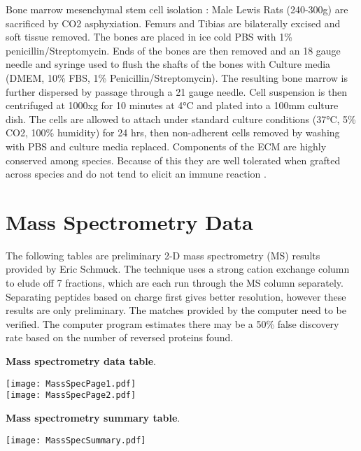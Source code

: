 \begin{outline}
\1 Bone marrow mesenchymal stem cell isolation \cite{Baharvand:2005mi,Tropel:2004pi}:
\2 Male Lewis Rats (240-300g) are sacrificed by CO2 asphyxiation. Femurs and Tibias are bilaterally excised and soft tissue removed.  The bones are placed in ice cold PBS with 1\% penicillin/Streptomycin.  Ends of the bones are then removed and an 18 gauge needle and syringe used to flush the shafts of the bones with Culture media (DMEM, 10\% FBS, 1\% Penicillin/Streptomycin).  The resulting bone marrow is further dispersed by passage through a 21 gauge needle.  Cell suspension is then centrifuged at 1000xg for 10 minutes at 4°C and plated into a 100mm culture dish.  The cells are allowed to attach under standard culture conditions (37°C, 5\% CO2, 100\% humidity) for 24 hrs, then non-adherent cells removed by washing with PBS and culture media replaced.
\1 Components of the ECM are highly conserved among species.  Because of this they are well tolerated when grafted across species and do not tend to elicit an immune reaction \cite{Bernard:1983lh,Bernard:1983fu,Constantinou:1991ye,Exposito:1992qo,Gilbert:2006ff}.

\end{outline}

\section{Mass Spectrometry Data}
The following tables are preliminary 2-D mass spectrometry (MS) results provided by Eric Schmuck.  The technique uses a strong cation exchange column to elude off 7 fractions, which are each run through the MS column separately. Separating peptides based on charge first gives better resolution, however these results are only preliminary. The matches provided by the computer need to be verified. The computer program estimates there may be a 50\% false discovery rate based on the number of reversed proteins found.

\begin{table}[!ht]
\centering
\caption{\textbf{Mass spectrometry data table}.}
\texttt{[image: MassSpecPage1.pdf]}\\
\texttt{[image: MassSpecPage2.pdf]}\\
\end{table}

\begin{table}[!ht]
\centering
\caption{\textbf{Mass spectrometry summary table}.}
\texttt{[image: MassSpecSummary.pdf]}\\
\end{table}





